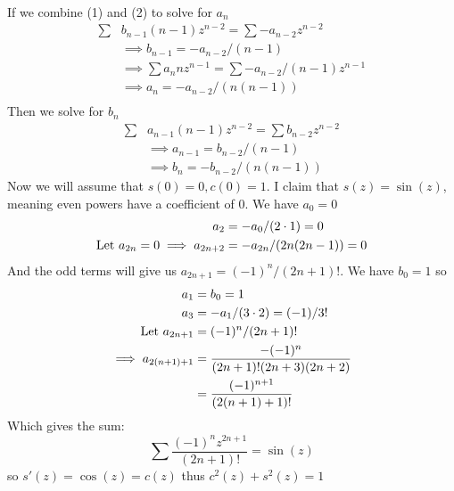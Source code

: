 \documentclass{article}
\begin{document}
\begin{enumerate}
\begin{align*}
      \end{align*}
      If we combine (1) and (2) to solve for $a_n$
      \begin{align*}
        \sum& b_{n-1}(n-1)z^{n-2}=\sum -a_{n-2}z^{n-2}\\
        &\implies b_{n-1}=-a_{n-2}/(n-1)\\
        &\implies\sum a_nnz^{n-1}=\sum -a_{n-2}/(n-1)z^{n-1}\\
        &\implies a_n=-a_{n-2}/(n(n-1))\\
      \end{align*}
      Then we solve for $b_n$
      \begin{align*}
        \sum& a_{n-1}(n-1)z^{n-2}=\sum b_{n-2}z^{n-2}\\
        &\implies a_{n-1}=b_{n-2}/(n-1)\\
        &\implies b_n=-b_{n-2}/(n(n-1))
      \end{align*}
      Now we will assume that $s(0)=0,c(0)=1$. I claim that $s(z)=\sin(z)$, meaning even powers have a coefficient of 0. We have $a_0=0$
      \begin{align*}
        a_2&=-a_0/(2\cdot1)=0\\
        \text{Let } a_{2n}=0\implies a_{2n+2}&=-a_{2n}/(2n(2n-1))=0
      \end{align*}
      And the odd terms will give us $a_{2n+1}=(-1)^n/(2n+1)!$. We have $b_0=1$ so
      \begin{align*}
        a_1&=b_0=1\\
        a_3&=-a_1/(3\cdot2)=(-1)/3!\\
        \text{Let } a_{2n+1}&=(-1)^n/(2n+1)!\\
        \implies a_{2(n+1)+1}&=\frac{-(-1)^n}{(2n+1)!(2n+3)(2n+2)}\\
        &=\frac{(-1)^{n+1}}{(2(n+1)+1)!}
      \end{align*}
      Which gives the sum:
      \[\sum \frac{(-1)^nz^{2n+1}}{(2n+1)!}=\sin(z)\]
      so $s'(z)=\cos(z)=c(z)$ thus $c^2(z)+s^2(z)=1$
  \end{enumerate}
\end{document}

